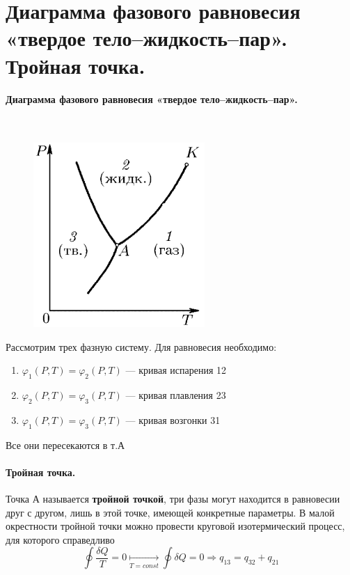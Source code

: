 \section{\normalsize Диаграмма фазового равновесия «твердое тело--жидкость--пар». Тройная точка.}
\paragraph{Диаграмма фазового равновесия «твердое тело--жидкость--пар».}$\;$\\
\begin{minipage}{75mm}
	\begin{figure}[H]
		\includegraphics[width=65mm]{ris17.png}
	\end{figure}
\end{minipage}
\begin{minipage}{100mm}
	Рассмотрим трех фазную систему. Для равновесия необходимо:
	\begin{enumerate}[(1)]
		\item $\varphi_1(P,T)=\varphi_2(P,T)$ --- кривая испарения 12
		\item $\varphi_2(P,T)=\varphi_3(P,T)$ --- кривая плавления 23
		\item $\varphi_1(P,T)=\varphi_3(P,T)$ --- кривая возгонки 31
	\end{enumerate}
	Все они пересекаются в т.А
\end{minipage}
\paragraph{Тройная точка.}
Точка А называется \textbf{тройной точкой}, три фазы могут находится в равновесии друг с другом, лишь в этой точке, имеющей конкретные параметры. В малой окрестности тройной точки можно провести круговой изотермический процесс, для которого справедливо
$$\oint\dfrac{\delta Q}{T}=0\underset{T=const}{\longmapsto}\oint\delta Q=0 \Rightarrow q_\text{13}=q_\text{32}+q_\text{21}$$

